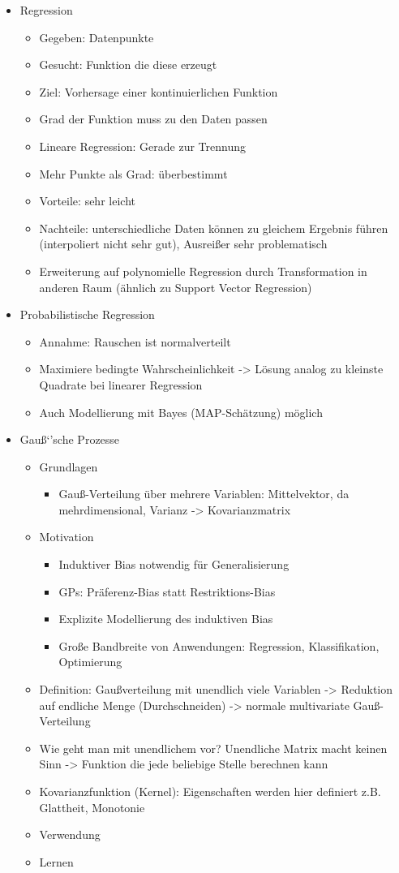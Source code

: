 \documentclass[paper=a4, fontsize=11pt]{scrartcl} %
\numberwithin{equation}{section} %
\numberwithin{figure}{section} %
\numberwithin{table}{section} %
\begin{document}
\begin{itemize}
\item Regression
\begin{itemize}
\item Gegeben: Datenpunkte
\item Gesucht: Funktion die diese erzeugt
\item Ziel: Vorhersage einer kontinuierlichen Funktion
\item Grad der Funktion muss zu den Daten passen
\item Lineare Regression: Gerade zur Trennung
\item Mehr Punkte als Grad: überbestimmt
\item Vorteile: sehr leicht
\item Nachteile: unterschiedliche Daten können zu gleichem Ergebnis führen (interpoliert nicht sehr gut), Ausreißer sehr problematisch
\item Erweiterung auf polynomielle Regression durch Transformation in anderen Raum (ähnlich zu Support Vector Regression)
\end{itemize}
\item Probabilistische Regression
\begin{itemize}
\item Annahme: Rauschen ist normalverteilt
\item Maximiere bedingte Wahrscheinlichkeit -> Lösung analog zu kleinste Quadrate bei linearer Regression
\item Auch Modellierung mit Bayes (MAP-Schätzung) möglich
\end{itemize}
\item Gauß`'sche Prozesse
\begin{itemize}
\item Grundlagen
\begin{itemize}
\item Gauß-Verteilung über mehrere Variablen: Mittelvektor, da mehrdimensional, Varianz -> Kovarianzmatrix
\end{itemize}
\item Motivation
\begin{itemize}
\item Induktiver Bias notwendig für Generalisierung
\item GPs: Präferenz-Bias statt Restriktions-Bias
\item Explizite Modellierung des induktiven Bias
\item Große Bandbreite von Anwendungen: Regression, Klassifikation, Optimierung
\end{itemize}
\item Definition: Gaußverteilung mit unendlich viele Variablen -> Reduktion auf endliche Menge (Durchschneiden) -> normale multivariate Gauß-Verteilung
\item Wie geht man mit unendlichem vor? Unendliche Matrix macht keinen Sinn -> Funktion die jede beliebige Stelle berechnen kann
\item Kovarianzfunktion (Kernel): Eigenschaften werden hier definiert z.B. Glattheit, Monotonie
\item Verwendung
\item Lernen
\end{itemize}
\end{itemize}
\end{document}
